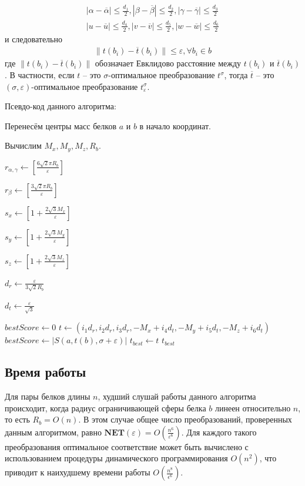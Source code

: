 \documentclass[a4papper]{article}
\newcommand{\ls}{\left[}
\newcommand{\rs}{\right]}
\newcommand{\lp}{\left(}
\newcommand{\rp}{\right)}
\newcommand{\la}{\leftarrow}
\newcommand{\eps}{\varepsilon}
\begin{document}
\begin{gather}
|\alpha - \overline{\alpha}| \leq \frac{d_1}{2}, |\beta - \overline{\beta}| \leq \frac{d_2}{2}, |\gamma - \overline{\gamma}| \leq \frac{d_3}{2}\\
|u - \overline{u}| \leq \frac{d_4}{2}, |v - \overline{v}| \leq \frac{d_5}{2}, |w - \overline{w}| \leq \frac{d_6}{2}
\end{gather}
и следовательно
\begin{gather}
\| t(b_i) - \overline{t}(b_i)\| \leq \eps, \forall b_i \in b
\end{gather}
где $\| t(b_i) - \overline{t}(b_i)\| $ обозначает Евклидово расстояние между $t(b_i)$ и $\overline{t}(b_i)$. В частности, если $t$ -- это $\sigma$-оптимальное преобразование $t^\sigma$, тогда $\overline{t}$ -- это $(\sigma, \eps)$-оптимальное преобразование $t_\eps^\sigma$.

Псевдо-код данного алгоритма:
\begin{algorithmic}[1]
\item Перенесём центры масс белков $a$ и $b$ в начало координат.
\item Вычислим $M_x, M_y, M_z, R_b$.
\item $r_{\alpha, \gamma} \la \ls \frac{6\sqrt{2}\pi R_b}{\eps}\rs$
\item $r_{\beta} \la \ls \frac{3\sqrt{2}\pi R_b}{\eps}\rs$
\item $s_x \la \ls 1 + \frac{2\sqrt{3}M_x}{\eps} \rs$
\item $s_y \la \ls 1 + \frac{2\sqrt{3}M_y}{\eps} \rs$
\item $s_z \la \ls 1 + \frac{2\sqrt{3}M_z}{\eps} \rs$
\item $d_r \la \frac{\eps}{3\sqrt{2}R_b}$
\item $d_t \la \frac{\eps}{\sqrt{3}}$
\item $bestScore \la 0$
\State $t \la (i_1d_r, i_2d_r, i_3d_r, -M_x + i_4d_t, -M_y + i_5d_t, -M_z + i_6d_t)$
\If {$|S(a, t(b), \sigma + \eps)| > bestScore$}
    \State $bestScore \la |S(a, t(b), \sigma + \eps)|$
    \State $t_{best} \la t$
\EndIf
\EndFor
\EndFor
\State \Return $t_{best}$
\end{algorithmic}
\subsection{Время работы}
Для пары белков длины $n$, худший слушай работы данного алгоритма происходит, когда радиус ограничивающей сферы белка $b$ линеен относительно $n$, то есть $R_b = O(n)$. В этом случае общее число преобразований, проверенных данным алгоритмом, равно $\mathbf{NET}(\eps) = O \lp \frac{n^6}{\eps^6} \rp$. Для каждого такого преобразования оптимальное соответствие может быть вычислено с использованием процедуры динамического программирования $O(n^2)$, что приводит к наихудшему времени работы $O \lp \frac{n^8}{\epsilon^6} \rp$.
\end{document}
